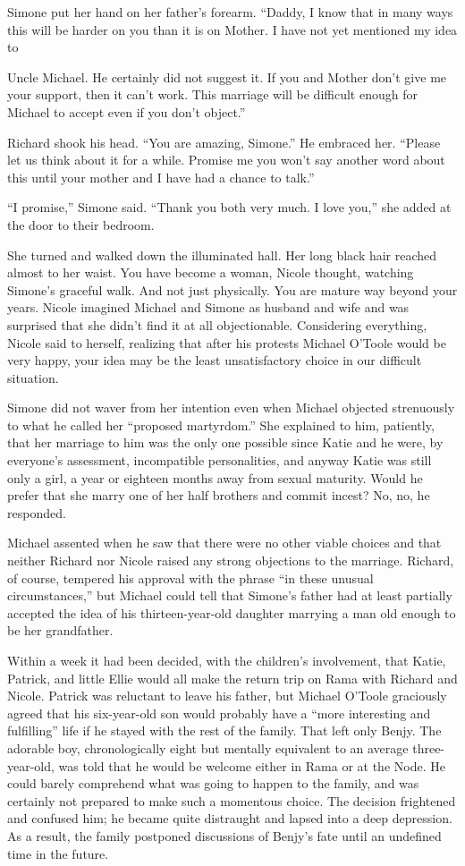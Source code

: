 \documentclass[]{article}
\begin{document}
{Simone put her hand on her father’s forearm. “Daddy, I know that in many ways this will be harder on you than it is on Mother. I have not yet mentioned my idea to

Uncle Michael. He certainly did not suggest it. If you and Mother don’t give me your support, then it can’t work. This marriage will be difficult enough for Michael to accept even if you don’t object.”

Richard shook his head. “You are amazing, Simone.” He embraced her. “Please let us think about it for a while. Promise me you won’t say another word about this until your mother and I have had a chance to talk.”

“I promise,” Simone said. “Thank you both very much. I love you,” she added at the door to their bedroom.

She turned and walked down the illuminated hall. Her long black hair reached almost to her waist. You have become a woman, Nicole thought, watching Simone’s graceful walk. And not just physically. You are mature way beyond your years. Nicole imagined Michael and Simone as husband and wife and was surprised that she didn’t find it at all objectionable. Considering everything, Nicole said to herself, realizing that after his protests Michael O’Toole would be very happy, your idea may be the least unsatisfactory choice in our difficult situation.

Simone did not waver from her intention even when Michael objected strenuously to what he called her “proposed martyrdom.” She explained to him, patiently, that her marriage to him was the only one possible since Katie and he were, by everyone’s assessment, incompatible personalities, and anyway Katie was still only a girl, a year or eighteen months away from sexual maturity. Would he prefer that she marry one of her half brothers and commit incest? No, no, he responded.

Michael assented when he saw that there were no other viable choices and that neither Richard nor Nicole raised any strong objections to the marriage. Richard, of course, tempered his approval with the phrase “in these unusual circumstances,” but Michael could tell that Simone’s father had at least partially accepted the idea of his thirteen-year-old daughter marrying a man old enough to be her grandfather.

Within a week it had been decided, with the children’s involvement, that Katie, Patrick, and little Ellie would all make the return trip on Rama with Richard and Nicole. Patrick was reluctant to leave his father, but Michael O’Toole graciously agreed that his six-year-old son would probably have a “more interesting and fulfilling” life if he stayed with the rest of the family. That left only Benjy. The adorable boy, chronologically eight but mentally equivalent to an average three-year-old, was told that he would be welcome either in Rama or at the Node. He could barely comprehend what was going to happen to the family, and was certainly not prepared to make such a momentous choice. The decision frightened and confused him; he became quite distraught and lapsed into a deep depression. As a result, the family postponed discussions of Benjy’s fate until an undefined time in the future.

}
\end{document}
